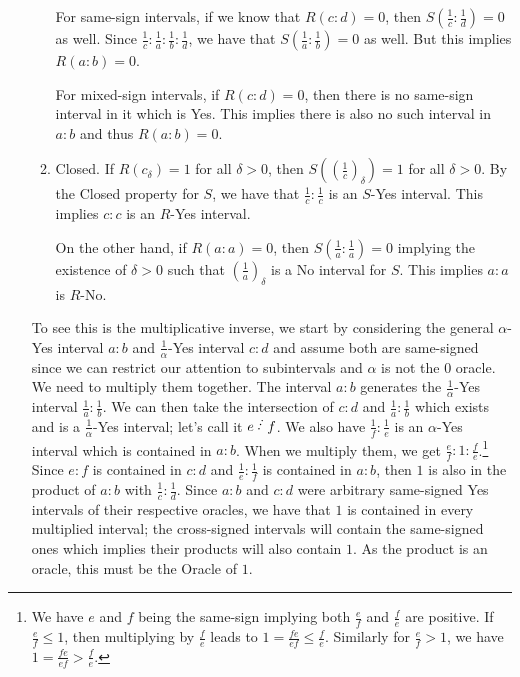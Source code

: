 \documentclass[12pt]{article}
\begin{document}
\begin{itemize}
\begin{enumerate}
        For same-sign intervals, if we know that $R(c:d) = 0$, then $S(\frac{1}{c}:\frac{1}{d}) = 0$ as well. Since $\frac{1}{c}:\frac{1}{a}:\frac{1}{b}:\frac{1}{d}$, we have that $S(\frac{1}{a}:\frac{1}{b}) = 0$ as well. But this implies $R(a:b) = 0$. 

        For mixed-sign intervals, if $R(c:d) = 0$, then there is no same-sign interval in it which is Yes. This implies there is also no such interval in $a:b$ and thus $R(a:b) = 0$.
        
        \item Closed. If $R(c_\delta) = 1$ for all $\delta > 0$, then $S((\frac{1}{c})_\delta) = 1$ for all $\delta > 0$. By the Closed property for $S$, we have that $\frac{1}{c}:\frac{1}{c}$ is an $S$-Yes interval. This implies $c:c$ is an $R$-Yes interval. 

        On the other hand, if $R(a:a)=0$, then $S(\frac{1}{a}:\frac{1}{a})=0$ implying the existence of $\delta>0$ such that $(\frac{1}{a})_\delta$ is a No interval for $S$. This implies $a:a$ is $R$-No. 
        
    \end{enumerate}
    
    To see this is the multiplicative inverse, we start by considering the general $\alpha$-Yes interval $a:b$ and $\frac{1}{\alpha}$-Yes interval $c:d$ and assume both are same-signed since we can restrict our attention to subintervals and $\alpha$ is not the 0 oracle. We need to multiply them together. The interval $a:b$ generates the $\frac{1}{\alpha}$-Yes interval $\frac{1}{a}:\frac{1}{b}$. We can then take the intersection of $c:d$ and $\frac{1}{a}:\frac{1}{b}$ which exists and is a $\frac{1}{\alpha}$-Yes interval; let's call it $e\lte f$. We also have $\frac{1}{f} : \frac{1}{e}$ is an $\alpha$-Yes interval which is contained in $a:b$. When we multiply them, we get $\frac{e}{f} : 1 : \frac{f}{e}$.\footnote{We have $e$ and $f$ being the same-sign implying both $\frac{e}{f}$ and $\frac{f}{e}$ are positive. If $\frac{e}{f} \leq 1$, then multiplying by $\frac{f}{e}$ leads to $1 = \frac{fe}{ef} \leq \frac{f}{e}$. Similarly for $\frac{e}{f} > 1$, we have $1 = \frac{fe}{ef} > \frac{f}{e}$.} Since $e:f$ is contained in $c:d$ and $\frac{1}{e}:\frac{1}{f}$ is contained in $a:b$, then $1$ is also in the product of $a:b$ with $\frac{1}{c}:\frac{1}{d}$. Since $a:b$ and $c:d$ were arbitrary same-signed Yes intervals of their respective oracles, we have that $1$ is contained in every multiplied interval; the cross-signed intervals will contain the same-signed ones which implies their products will also contain $1$. As the product is an oracle, this must be the Oracle of $1$. 
    
\end{itemize}
\end{document}

